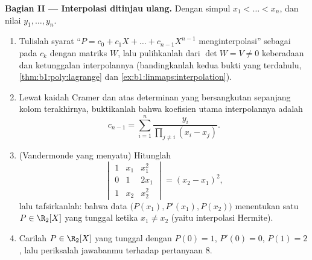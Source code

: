 \begin{problem}
\medskip
\noindent\textbf{Bagian II --- Interpolasi ditinjau ulang.} Dengan simpul
$x_1 < \dots < x_n$, dan nilai $y_1, \dots, y_n$.
\begin{enumerate}[resume]
  \item Tulislah syarat ``$P = c_0 + c_1X + \dots +
        c_{n-1}X^{n-1}$ menginterpolasi'' sebagai  pada
        $c_k$ dengan matriks $W$, lalu pulihkanlah dari $\det W = V \neq
        0$ keberadaan dan ketunggalan interpolannya
        (bandingkanlah kedua bukti yang terdahulu,
        \cref{thm:b1:poly:lagrange} dan
        \cref{ex:b1:linmaps:interpolation}).
  \item Lewat kaidah Cramer dan  atas determinan
        yang bersangkutan sepanjang kolom terakhirnya, buktikanlah bahwa
        koefisien utama interpolannya adalah
        \[
        c_{n-1} = \sum_{i=1}^{n}
        \frac{y_i}{\prod_{j \neq i}(x_i - x_j)} .
        \]
  \item (Vandermonde yang menyatu) Hitunglah
        \[
        \begin{vmatrix}
        1 & x_1 & x_1^2\\
        0 & 1 & 2x_1\\
        1 & x_2 & x_2^2
        \end{vmatrix}
        = (x_2 - x_1)^2 ,
        \]
        lalu tafsirkanlah: bahwa data $\bigl(P(x_1), P'(x_1),
        P(x_2)\bigr)$ menentukan satu $P \in \R_2[X]$ yang tunggal ketika
        $x_1 \neq x_2$ (yaitu interpolasi Hermite).
  \item Carilah $P \in \R_2[X]$ yang tunggal dengan $P(0) = 1$, $P'(0)
        = 0$, $P(1) = 2$, lalu periksalah jawabanmu terhadap
        pertanyaan 8.
\end{enumerate}


\end{problem}
